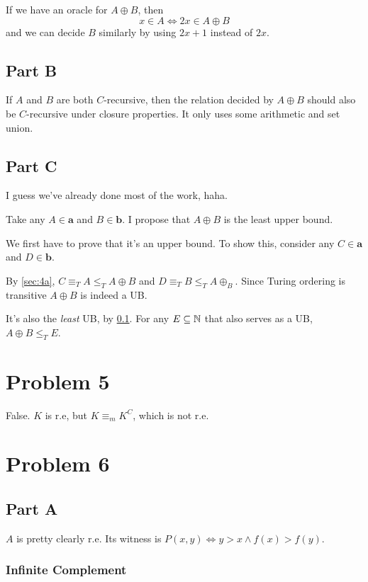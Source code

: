\documentclass[12pt]{article}
\begin{document}
If we have an oracle for $A \oplus B$, then
\[x \in A \iff 2x \in A \oplus B\]
and we can decide $B$ similarly by using $2x+1$ instead of $2x$.

\subsection{Part B}\label{sec:4b}

If $A$ and $B$ are both $C$-recursive, then the relation decided by
$A \oplus B$ should also be $C$-recursive under closure properties.
It only uses some arithmetic and set union.

\subsection{Part C}

I guess we've already done most of the work, haha.

Take any $A \in \mathbf{a}$ and $B \in \mathbf{b}$.
I propose that $A \oplus B$ is the least upper bound.

We first have to prove that it's an upper bound.
To show this, consider any $C \in \mathbf{a}$ and $D \in \mathbf{b}$.

By \ref{sec:4a}, $C \equiv_T A \le_T A \oplus B$ and $D \equiv_T B \le_T A \oplus_B$.
Since Turing ordering is transitive $A \oplus B$ is indeed a UB.

It's also the \textit{least} UB, by \ref{sec:4b}.
For any $E \subseteq \mathbb{N}$ that also serves as a UB, $A \oplus B \le_T E$.

\section{Problem 5}

False. $K$ is r.e, but $K \equiv_m K^C$, which is not r.e.

\pagebreak

\section{Problem 6}

\subsection{Part A}

$A$ is pretty clearly r.e.
Its witness is $P(x, y) \iff y > x \land f(x) > f(y)$.

\subsubsection{Infinite Complement}
\end{document}
